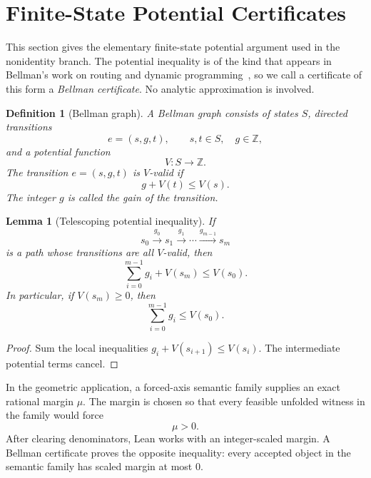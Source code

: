 \documentclass[11pt]{article}
\newtheorem{lemma}[theorem]{Lemma}
\newtheorem{definition}[theorem]{Definition}
\newcommand{\Z}{\mathbb{Z}}
\begin{document}
\section{Finite-State Potential Certificates}
\label{sec:bellman}

This section gives the elementary finite-state potential argument used in
the nonidentity branch.  The potential inequality is of the kind that appears
in Bellman's work on routing and dynamic programming~\cite{bellman}, so we
call a certificate of this form a \emph{Bellman certificate}.  No analytic
approximation is involved.

\begin{definition}[Bellman graph]
A Bellman graph consists of states \(S\), directed transitions
\[
  e=(s,g,t),\qquad s,t\in S,\quad g\in\Z,
\]
and a potential function
\[
  V:S\to\Z.
\]
The transition \(e=(s,g,t)\) is \(V\)-valid if
\[
  g+V(t)\le V(s).
\]
The integer \(g\) is called the gain of the transition.
\end{definition}

\begin{lemma}[Telescoping potential inequality]
If
\[
  s_0\xrightarrow{g_0}s_1\xrightarrow{g_1}\cdots
  \xrightarrow{g_{m-1}}s_m
\]
is a path whose transitions are all \(V\)-valid, then
\[
  \sum_{i=0}^{m-1}g_i+V(s_m)\le V(s_0).
\]
In particular, if \(V(s_m)\ge0\), then
\[
  \sum_{i=0}^{m-1}g_i\le V(s_0).
\]
\end{lemma}

\begin{proof}
Sum the local inequalities \(g_i+V(s_{i+1})\le V(s_i)\).  The intermediate
potential terms cancel.
\end{proof}

In the geometric application, a forced-axis semantic family supplies an exact
rational margin \(\mu\).  The margin is chosen so that every feasible
unfolded witness in the family would force
\[
  \mu>0.
\]
After clearing denominators, Lean works with an integer-scaled margin.  A
Bellman certificate proves the opposite inequality: every accepted object in
the semantic family has scaled margin at most \(0\).
\end{document}
